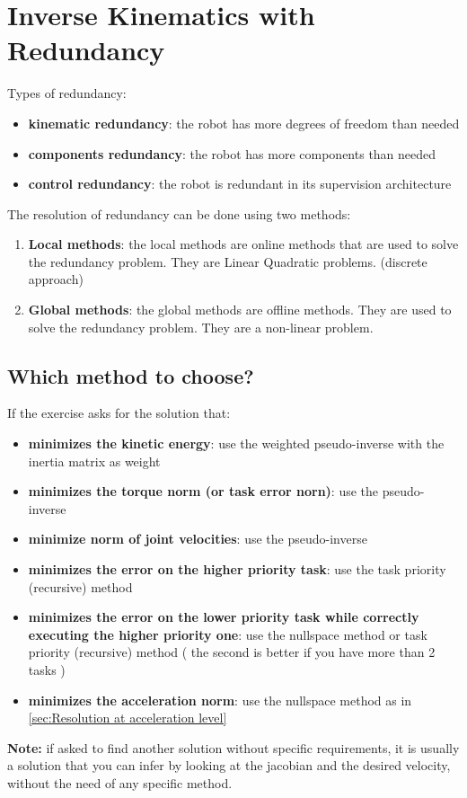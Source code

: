 \documentclass[a4paper,12pt]{article}
\begin{document}
\section{Inverse Kinematics with Redundancy}
Types of redundancy:
\begin{itemize}
    \item \textbf{kinematic redundancy}: the robot has more degrees of freedom than needed
    \item \textbf{components redundancy}: the robot has more
     components than needed
     \item \textbf{control redundancy}: the robot is redundant in its supervision
     architecture
\end{itemize}
    The resolution of redundancy can be done using two methods:
\begin{enumerate}
    \item \textbf{Local methods}: the local methods are online methods
     that are used to solve the redundancy problem. They are Linear Quadratic problems.
     (discrete approach)
    \item \textbf{Global methods}: the global methods are offline methods.
     They are used to solve the redundancy problem. They are a
      non-linear problem.
\end{enumerate}
\subsection{Which method to choose?}
If the exercise asks for the solution that:
\begin{itemize}
    \item \textbf{minimizes the kinetic energy}: use the weighted pseudo-inverse with the inertia matrix as weight
    \item \textbf{minimizes the torque norm (or task error norn)}: use the pseudo-inverse
    \item \textbf{minimize norm of joint velocities}: use the pseudo-inverse
    \item \textbf{minimizes the error on the higher priority task}: use the task priority (recursive) method
    \item \textbf{minimizes the error on the lower priority task while correctly executing the higher priority one}: use the nullspace method or task priority (recursive) method (
        the second is better if you have more than 2 tasks
    )
    \item \textbf{minimizes the acceleration norm}: use the nullspace method as in \ref{sec:Resolution at acceleration level}
\end{itemize}
\textbf{Note:} if asked to find another solution without 
specific requirements, it is usually a solution that you can 
infer by looking
at the jacobian and the desired velocity, without 
the need of any specific method.
\end{document}

